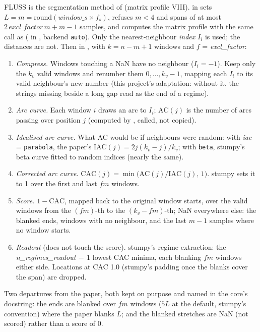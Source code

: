 FLUSS is the segmentation method of \citet{gharghabi2017matrix} (matrix profile VIII). 
in  sets $L = m = \mathrm{round}(\textit{window\_s}\times f_s)$,
refuses $m < 4$ and spans of at most $2\,\textit{excl\_factor}\,m + m - 1$ samples, and computes
the matrix profile with the same call as 
( in , backend
\texttt{auto}). Only the nearest-neighbour \emph{index} $I_i$ is used; the distances are not. Then
 in , with
$k = n - m + 1$ windows and $f$ = \emph{excl\_factor}:
\begin{enumerate}
\item \emph{Compress.} Windows touching a NaN have no neighbour ($I_i = -1$). Keep only the $k_v$
  valid windows and renumber them $0,\dots,k_v - 1$, mapping each $I_i$ to its valid neighbour's
  new number (this project's adaptation: without it, the strings missing beside a long gap read as
  the end of a regime).
\item \emph{Arc curve.} Each window $i$ draws an arc to $I_i$; $\mathrm{AC}(j)$ is the number of
  arcs passing over position $j$ (computed by , called, not copied).
\item \emph{Idealised arc curve.} What AC would be if neighbours were random: with \emph{iac} =
  \texttt{parabola}, the paper's $\mathrm{IAC}(j) = 2j(k_v - j)/k_v$; with \texttt{beta}, stumpy's
  beta curve fitted to random indices (nearly the same).
\item \emph{Corrected arc curve.} $\mathrm{CAC}(j) = \min\bigl(\mathrm{AC}(j)/\mathrm{IAC}(j),\,1\bigr)$.
  stumpy sets it to 1 over the first and last $f m$ windows.
\item \emph{Score.} $1 - \mathrm{CAC}$, mapped back to the original window starts, over the valid
  windows from the $(fm)$-th to the $(k_v - fm)$-th; NaN everywhere else: the blanked ends, windows
  with no neighbour, and the last $m-1$ samples where no window starts.
\item \emph{Readout} (does not touch the score). stumpy's regime extraction: the
  \emph{n\_regimes\_readout}$\,-\,1$ lowest CAC minima, each blanking $f m$ windows either side.
  Locations at CAC 1.0 (stumpy's padding once the blanks cover the span) are dropped.
\end{enumerate}
Two departures from the paper, both kept on purpose and named in the core's docstring: the ends
are blanked over $f m$ windows ($5L$ at the default, stumpy's convention) where the paper blanks
$L$; and the blanked stretches are NaN (not scored) rather than a score of 0.

